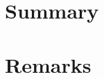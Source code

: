 \documentclass[12pt,titlepage,final]{article}
\begin{document}
\section{Summary}

\section{Remarks}

  
\end{document}
